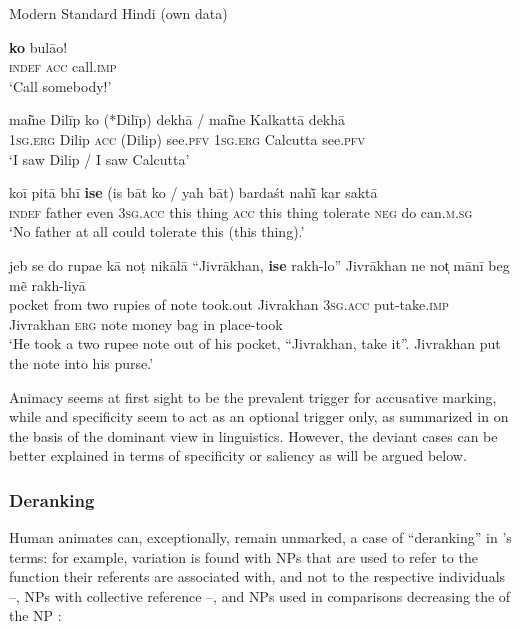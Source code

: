 \documentclass[output=paper]{LSP/langsci}
\begin{document}
\ea Modern Standard Hindi (own data)\label{10-mo-ex:3}

\ea \label{10-mo-ex:3a}
 \textbf{ko} bulāo!\\
\textsc{indef} \textsc{acc} call.\textsc{imp}\\
\glt ‘Call somebody!’

\ex \label{10-mo-ex:3b}
\gll mai͂ne Dilīp ko (*Dilīp) dekhā / mai͂ne Kalkattā dekhā\\
\textsc{1sg.erg} Dilip \textsc{acc} (Dilip) see.\textsc{pfv} { } \textsc{1sg.erg} Calcutta see.\textsc{pfv}\\
\glt ‘I saw Dilip / I saw Calcutta’

\ex \label{10-mo-ex:3c}
\gll koī pitā bhī \textbf{ise} (is bāt ko / yah bāt) bardaśt nahī̃  kar saktā\\
\textsc{indef} father even \textsc{3sg.acc} this thing \textsc{acc} { }  this thing tolerate \textsc{neg} do can.\textsc{m.sg}\\
\glt ‘No father at all could tolerate this (this thing).’

\ex \label{10-mo-ex:3d}
\gll jeb se do rupae kā noṭ nikālā “Jivrākhan, \textbf{ise} rakh-lo”  Jivrākhan ne not̩ mānī beg mẽ rakh-liyā\\
 pocket from two rupies of note took.out Jivrakhan \textsc{3sg.acc} put-take.\textsc{imp} Jivrakhan \textsc{erg} note money bag in place-took\\
\glt ‘He took a two rupee note out of his pocket, “Jivrakhan, take it”. Jivrakhan put the note into his purse.’
\z
\z

Animacy seems at first sight to be the prevalent trigger for accusative marking, while  and specificity seem to act as an optional trigger only, as summarized in \citet[469]{Aissen2003Differential} on the basis of the dominant view in  linguistics. However, the deviant cases can be better explained in terms of specificity or saliency as will be argued below.


\subsubsection{Deranking}\label{10-mo-sec:2-2-1}

Human animates can, exceptionally, remain unmarked, a case of “deranking” in \citeauthor{Aissen2003Differential}’s \citeyear{Aissen2003Differential} terms: for example, variation is found with NPs that are used to refer to the function their referents are associated with, and not to the respective individuals --, NPs with collective reference --, and NPs used in comparisons decreasing the  of the NP :
\end{document}
